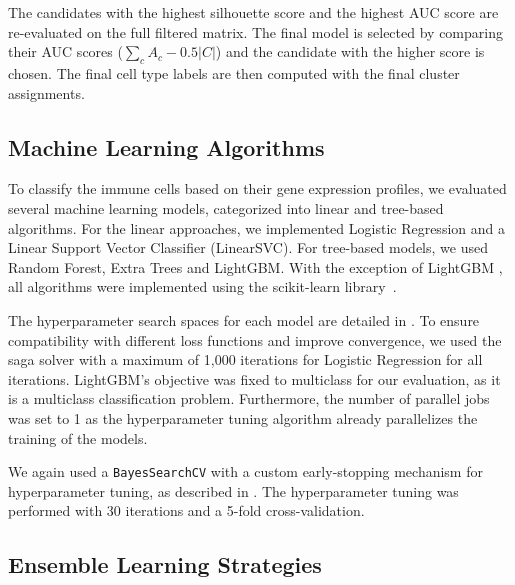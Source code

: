 \documentclass[11pt]{article}
\begin{document}
The candidates with the highest silhouette score and the highest AUC score are re-evaluated on the full filtered matrix. The final model is selected by comparing their AUC scores ($\sum_{c} A_{c} - 0.5 |C|$) and the candidate with the higher score is chosen. The final cell type labels are then computed with the final cluster assignments.


\subsection{Machine Learning Algorithms}\label{sec:methods:machine-learning}

To classify the immune cells based on their gene expression profiles, we evaluated several machine learning models, categorized into linear and tree-based algorithms. For the linear approaches, we implemented Logistic Regression and a Linear Support Vector Classifier (LinearSVC). For tree-based models, we used Random Forest, Extra Trees and LightGBM. With the exception of LightGBM \cite{NIPS2017_6449f44a}, all algorithms were implemented using the scikit-learn library~\cite{sklearn}.

The hyperparameter search spaces for each model are detailed in . To ensure compatibility with different loss functions and improve convergence, we used the saga solver with a maximum of 1,000 iterations for Logistic Regression for all iterations. LightGBM's objective was fixed to multiclass for our evaluation, as it is a multiclass classification problem. Furthermore, the number of parallel jobs was set to 1 as the hyperparameter tuning algorithm already parallelizes the training of the models.

We again used a \texttt{BayesSearchCV} with a custom early-stopping mechanism for hyperparameter tuning, as described in . The hyperparameter tuning was performed with 30 iterations and a 5-fold cross-validation.


\subsection{Ensemble Learning Strategies}\label{sec:methods:ensemble-learning}
\end{document}
